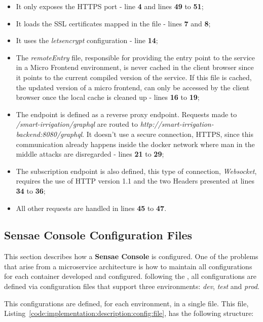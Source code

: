\begin{itemize}
    \item It only exposes the HTTPS port - line \textbf{4} and lines \textbf{49} to \textbf{51};
    \item It loads the SSL certificates mapped in the  file - lines \textbf{7} and \textbf{8};
    \item It uses the \textit{letsencrypt} configuration - line \textbf{14};
    \item The \textit{remoteEntry} file, responsible for providing the entry point to the service in a Micro Frontend environment, is never cached in the client browser since it points to the current compiled version of the service. If this file is cached, the updated version of a micro frontend, can only be accessed by the client browser once the local cache is cleaned up - lines \textbf{16} to \textbf{19};
    \item The  endpoint is defined as a reverse proxy endpoint. Requests made to \textit{/smart-irrigation/graphql} are routed to \textit{http://smart-irrigation-backend:8080/graphql}. It doesn't use a secure connection, HTTPS, since this communication already happens inside the docker network where man in the middle attacks are disregarded - lines \textbf{21} to \textbf{29};
    \item The  subscription endpoint is also defined, this type of connection, \textit{Websocket}, requires the use of HTTP version 1.1 and the two Headers presented at lines \textbf{34} to \textbf{36};
    \item All other requests are handled in lines \textbf{45} to \textbf{47}.
\end{itemize}

\subsection{Sensae Console Configuration Files}
\label{subsec:implementation:description:config}

This section describes how a \textbf{Sensae Console} is configured. One of the problems that arise from a microservice architecture is how to maintain all configurations for each container developed and configured. following the , all configurations are defined via configuration files that support three environments: \textit{dev}, \textit{test} and \textit{prod}.

This configurations are defined, for each environment, in a single file. This file, Listing~\ref{code:implementation:description:config:file}, has the following structure:

